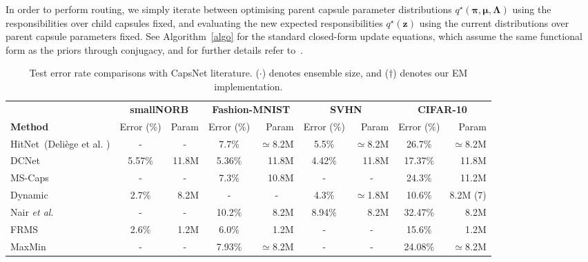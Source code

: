 \documentclass[letterpaper]{article} \usepackage{aaai20}  \usepackage{times}  \usepackage{helvet} \usepackage{courier}  \usepackage[hyphens]{url}  \usepackage{graphicx} \urlstyle{rm} \def\UrlFont{\rm}  \usepackage{graphicx}  \frenchspacing  \setlength{\pdfpagewidth}{8.5in}  \setlength{\pdfpageheight}{11in}  \nocopyright
\begin{document}
In order to perform routing, we simply iterate between optimising parent capsule parameter distributions $q^{\star}(\boldsymbol{\pi},\boldsymbol{\mu},\boldsymbol{\Lambda})$ using the responsibilities over child capsules fixed, and evaluating the new expected responsibilities $q^{\star}(\mathbf{z})$ using the current distributions over parent capsule parameters fixed. See Algorithm~\ref{algo} for the standard closed-form update equations, which assume the same functional form as the priors through conjugacy, and for further details refer to~\cite{bishop2006pattern}.
\begin{table*}[t]
\caption{Test error rate comparisons with CapsNet literature. ($\cdot$) denotes ensemble size, and ($\dagger$) denotes our EM implementation.}
\footnotesize
    \begin{tabular}{lcrcrcrcr}
        \toprule
        & \multicolumn{2}{c}{\textbf{smallNORB}} & \multicolumn{2}{c}{\textbf{Fashion-MNIST}} & \multicolumn{2}{c}{\textbf{SVHN}} & \multicolumn{2}{c}{\textbf{CIFAR-10}} \\
        \textbf{Method} & Error ($\%$) & Param & Error ($\%$) & Param & Error ($\%$) & Param & Error ($\%$) & Param \\
        \midrule
        HitNet~\scriptsize{(Deliège et al. \citeyear{deliege2019effective})} & \multicolumn{1}{c}{-} & \multicolumn{1}{c}{-} & 7.7$\%$  & $\simeq$8.2M & 5.5$\%$ & $\simeq$8.2M & 26.7$\%$ & $\simeq$8.2M \\
        DCNet~\scriptsize{\cite{phaye2018dense}} & 5.57$\%$ & 11.8M & 5.36$\%$ & 11.8M & 4.42$\%$ & 11.8M & 17.37$\%$ & 11.8M \\
        MS-Caps~\scriptsize{\cite{xiang2018ms}} & \multicolumn{1}{c}{-} & \multicolumn{1}{c}{-} & 7.3$\%$ & 10.8M & \multicolumn{1}{c}{-} & \multicolumn{1}{c}{-} & 24.3$\%$ & 11.2M \\
        Dynamic~\scriptsize{\cite{sabour2017dynamic}} & 2.7$\%$ & 8.2M & \multicolumn{1}{c}{-} & \multicolumn{1}{c}{-} & 4.3$\%$ & $\simeq$1.8M & 10.6$\%$ & 8.2M \scriptsize{(7)} \\
        Nair \textit{et al}.~\scriptsize{\cite{nair2018pushing}} & \multicolumn{1}{c}{-} & \multicolumn{1}{c}{-} & 10.2$\%$ & 8.2M & 8.94$\%$ & 8.2M & 32.47$\%$ & 8.2M \\
        FRMS~\scriptsize{\cite{zhang2018fast}} & 2.6$\%$ & 1.2M & 6.0$\%$ & 1.2M & \multicolumn{1}{c}{-} & \multicolumn{1}{c}{-} & 15.6$\%$ & 1.2M \\
        MaxMin~\scriptsize{\cite{zhao2019capsule}} & \multicolumn{1}{c}{-} & \multicolumn{1}{c}{-} & 7.93$\%$ & $\simeq$8.2M & \multicolumn{1}{c}{-} & \multicolumn{1}{c}{-} & 24.08$\%$ & $\simeq$8.2M \\

\end{tabular}
\end{table*}
\end{document}
